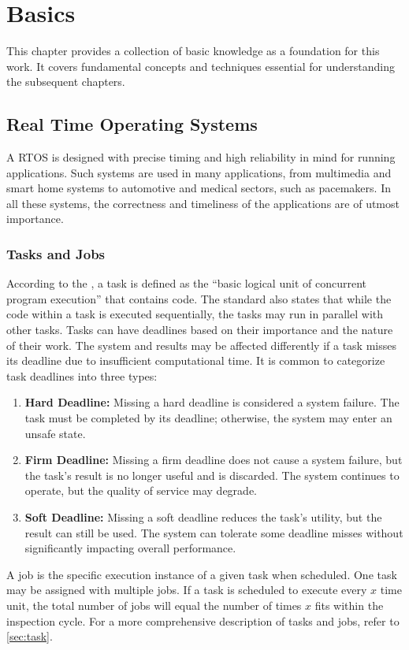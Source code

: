 \chapter{Basics}\label{ch:basics}
This chapter provides a collection of basic knowledge as a foundation for this work. It covers fundamental concepts and techniques essential for understanding the subsequent chapters.

\section{Real Time Operating Systems}\label{sec:rtos}
A \ac{RTOS} is designed with precise timing and high reliability in mind for running applications\cite{stankovicRealtimeOperatingSystems2004}. Such systems are used in many applications, from multimedia and smart home systems to automotive and medical sectors, such as pacemakers\cite{hambardeSurveyRealTime2014}. In all these systems, the correctness and timeliness of the applications are of utmost importance\cite{hambardeSurveyRealTime2014}.

\subsection{Tasks and Jobs}\label{sec:tasks_and_jobs}
According to the \textcite{IEEEStandardRealTime}, a task is defined as the ``basic logical unit of concurrent program execution'' that contains code. The standard also states that while the code within a task is executed sequentially, the tasks may run in parallel with other tasks. Tasks can have deadlines based on their importance and the nature of their work. The system and results may be affected differently if a task misses its deadline due to insufficient computational time. It is common to categorize task deadlines into three types\cite{dengSchedulingRealtimeApplications1997,abeniIntegratingMultimediaApplications1998,shindeComparisonRealTime2017}:
\begin{enumerate}
    \item \textbf{Hard Deadline:}
 Missing a hard deadline is considered a system failure. The task must be completed by its deadline; otherwise, the system may enter an unsafe state.
    \item \textbf{Firm Deadline:}
 Missing a firm deadline does not cause a system failure, but the task's result is no longer useful and is discarded. The system continues to operate, but the quality of service may degrade.
    \item \textbf{Soft Deadline:}
 Missing a soft deadline reduces the task's utility, but the result can still be used. The system can tolerate some deadline misses without significantly impacting overall performance.
\end{enumerate}
A job is the specific execution instance of a given task when scheduled. One task may be assigned with multiple jobs. If a task is scheduled to execute every $x$ time unit, the total number of jobs will equal the number of times $x$ fits within the inspection cycle. For a more comprehensive description of tasks and jobs, refer to \cref{sec:task}.

